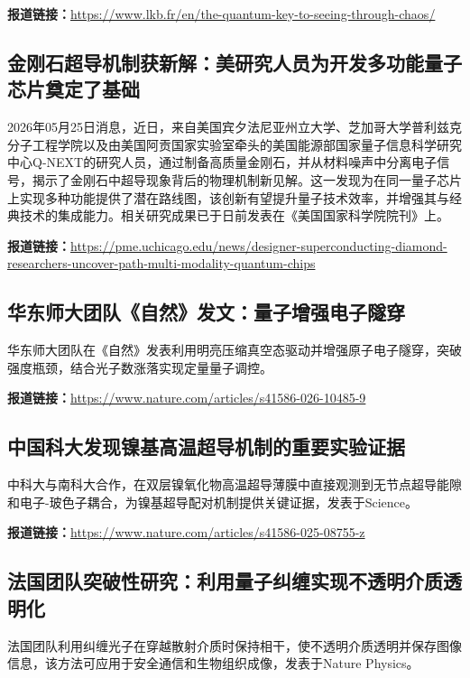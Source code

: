 \documentclass[12pt,a4paper]{ctexart}
\begin{document}
\noindent\textbf{报道链接：}\url{https://www.lkb.fr/en/the-quantum-key-to-seeing-through-chaos/}

\subsection{ 金刚石超导机制获新解：美研究人员为开发多功能量子芯片奠定了基础 }

2026年05月25日消息，近日，来自美国宾夕法尼亚州立大学、芝加哥大学普利兹克分子工程学院以及由美国阿贡国家实验室牵头的美国能源部国家量子信息科学研究中心Q-NEXT的研究人员，通过制备高质量金刚石，并从材料噪声中分离电子信号，揭示了金刚石中超导现象背后的物理机制新见解。这一发现为在同一量子芯片上实现多种功能提供了潜在路线图，该创新有望提升量子技术效率，并增强其与经典技术的集成能力。相关研究成果已于日前发表在《美国国家科学院院刊》上。

\noindent\textbf{报道链接：}\url{https://pme.uchicago.edu/news/designer-superconducting-diamond-researchers-uncover-path-multi-modality-quantum-chips}

\subsection{ 华东师大团队《自然》发文：量子增强电子隧穿 }

华东师大团队在《自然》发表利用明亮压缩真空态驱动并增强原子电子隧穿，突破强度瓶颈，结合光子数涨落实现定量量子调控。

\noindent\textbf{报道链接：}\url{https://www.nature.com/articles/s41586-026-10485-9}

\subsection{ 中国科大发现镍基高温超导机制的重要实验证据 }

中科大与南科大合作，在双层镍氧化物高温超导薄膜中直接观测到无节点超导能隙和电子-玻色子耦合，为镍基超导配对机制提供关键证据，发表于Science。

\noindent\textbf{报道链接：}\url{https://www.nature.com/articles/s41586-025-08755-z}

\subsection{ 法国团队突破性研究：利用量子纠缠实现不透明介质透明化 }

法国团队利用纠缠光子在穿越散射介质时保持相干，使不透明介质透明并保存图像信息，该方法可应用于安全通信和生物组织成像，发表于Nature Physics。
\end{document}
